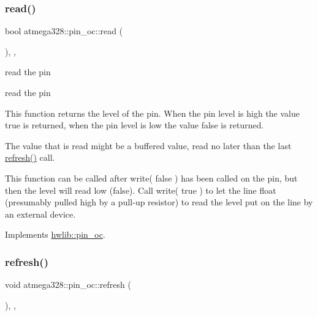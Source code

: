 \mbox{\label{classatmega328_1_1pin__oc_a89733673f7d2e2e96b2b71dbabf4505a}} 
\subsubsection{\texorpdfstring{read()}{read()}}
{\footnotesize\ttfamily bool atmega328\+::pin\+\_\+oc\+::read (\begin{DoxyParamCaption}{ }\end{DoxyParamCaption})\hspace{0.3cm}{\ttfamily [inline]}, {\ttfamily [override]}, {\ttfamily [virtual]}}





read the pin

read the pin

This function returns the level of the pin. When the pin level is high the value true is returned, when the pin level is low the value false is returned.

The value that is read might be a buffered value, read no later than the last \hyperlink{classatmega328_1_1pin__oc_a1768ece62a74ed6f657427cb0db5b5e3}{refresh()} call.

This function can be called after write( false ) has been called on the pin, but then the level will read low (false). Call write( true ) to let the line float (presumably pulled high by a pull-\/up resistor) to read the level put on the line by an external device. 

Implements \hyperlink{classhwlib_1_1pin__oc_a51180afd605add59b96105fa98e29f88}{hwlib\+::pin\+\_\+oc}.

\mbox{\label{classatmega328_1_1pin__oc_a1768ece62a74ed6f657427cb0db5b5e3}} 
\subsubsection{\texorpdfstring{refresh()}{refresh()}}
{\footnotesize\ttfamily void atmega328\+::pin\+\_\+oc\+::refresh (\begin{DoxyParamCaption}{ }\end{DoxyParamCaption})\hspace{0.3cm}{\ttfamily [inline]}, {\ttfamily [override]}, {\ttfamily [virtual]}}






